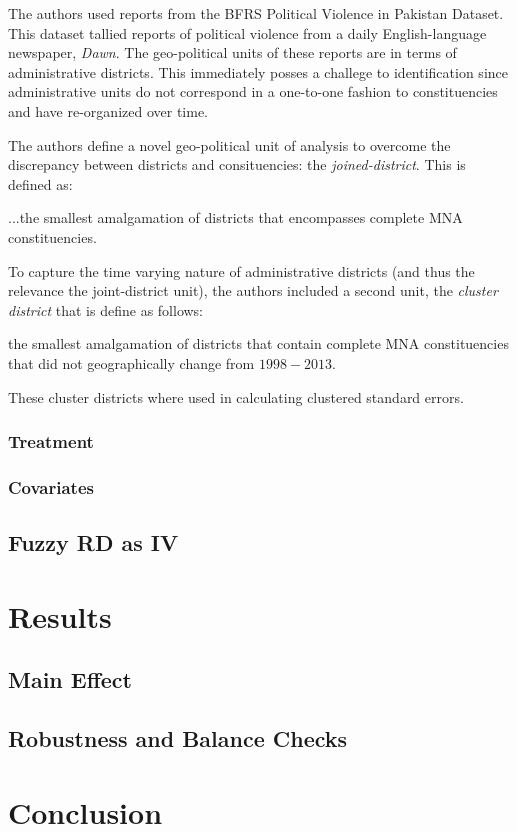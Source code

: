 \documentclass{scrartcl}
\begin{document}
The authors used reports from the BFRS Political Violence in Pakistan Dataset. This dataset tallied reports of political violence from a daily English-language newspaper, \textit{Dawn}. The geo-political units of these reports are in terms of administrative districts. This immediately posses a challege to identification since administrative units do not correspond in a one-to-one fashion to constituencies and have re-organized over time.

The authors define a novel geo-political unit of analysis to overcome the discrepancy between districts and consituencies: the \textit{joined-district}. 
This is defined as:
\begin{displayquote}
...the smallest amalgamation of districts that encompasses complete MNA constituencies. 
\end{displayquote}

To capture the time varying nature of administrative districts (and thus the relevance the joint-district unit), the authors included a second unit, the \textit{cluster district} that is define as follows:

\begin{displayquote}
the smallest amalgamation of districts that contain complete MNA constituencies that did not geographically change from $1998 - 2013$.
\end{displayquote}

These cluster districts where used in calculating clustered standard errors.

\subsubsection{Treatment}

\subsubsection{Covariates}

\subsection{Fuzzy RD as IV}


\section{Results}

\subsection{Main Effect}






\subsection{Robustness and Balance Checks}

\section{Conclusion}



\end{document}
